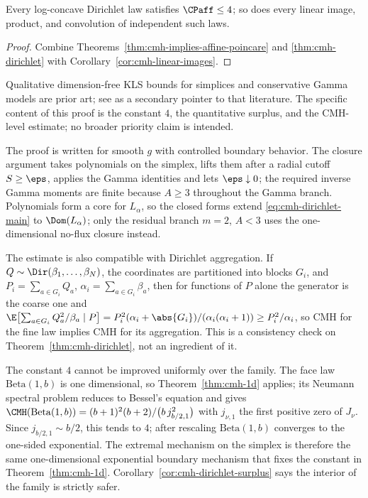 \documentclass[../../main.tex]{subfiles}
\begin{document}
\begin{corollary}
\label{cor:cmh-dirichlet-poincare}
Every log-concave Dirichlet law satisfies $\CPaff\le4$; so does every linear image, product, and
convolution of independent such laws.
\end{corollary}

\begin{proof}
Combine Theorems~\ref{thm:cmh-implies-affine-poincare} and \ref{thm:cmh-dirichlet} with
Corollary~\ref{cor:cmh-linear-images}.
\end{proof}

Qualitative dimension-free KLS bounds for simplices and conservative Gamma models are prior
art; see \cite[\S1.2]{KolesnikovMilman2016OrliczKLS} as a secondary pointer to that literature.
The specific content of this proof is the constant $4$, the quantitative surplus, and the
CMH-level estimate; no broader priority claim is intended.

\begin{remark}
\label{rem:cmh-dirichlet-closure}
The proof is written for smooth $g$ with controlled boundary behavior. The closure argument
takes polynomials on the simplex, lifts them after a radial cutoff $S\ge\eps$, applies the Gamma
identities and lets $\eps\downarrow0$; the required inverse Gamma moments are finite because
$A\ge3$ throughout the Gamma branch. Polynomials form a core for $L_\alpha$, so the closed forms
extend \eqref{eq:cmh-dirichlet-main} to $\Dom(L_\alpha)$; only the residual branch $m=2$, $A<3$
uses the one-dimensional no-flux closure instead.

The estimate is also compatible with Dirichlet aggregation. If
$Q\sim\Dir(\beta_1,\dots,\beta_N)$, the coordinates are partitioned into blocks $G_i$, and
$P_i=\sum_{a\in G_i}Q_a$, $\alpha_i=\sum_{a\in G_i}\beta_a$, then for functions of $P$ alone the
generator is the coarse one and
$\E\bigl[\sum_{a\in G_i}Q_a^2/\beta_a\mid P\bigr]
 =P_i^2(\alpha_i+\abs{G_i})/(\alpha_i(\alpha_i+1))\ge P_i^2/\alpha_i$,
so CMH for the fine law implies CMH for its aggregation. This is a consistency check on
Theorem~\ref{thm:cmh-dirichlet}, not an ingredient of it.
\end{remark}

\begin{remark}
\label{rem:cmh-dirichlet-sharp}
The constant $4$ cannot be improved uniformly over the family. The face law
$\mathrm{Beta}(1,b)$ is one dimensional, so Theorem~\ref{thm:cmh-1d} applies; its Neumann
spectral problem reduces to Bessel's equation and gives
$\CMH(\mathrm{Beta}(1,b))=(b+1)^2(b+2)/\bigl(b\,j_{b/2,1}^2\bigr)$ with $j_{\nu,1}$ the first
positive zero of $J_\nu$. Since $j_{b/2,1}\sim b/2$, this tends to $4$; after rescaling
$\mathrm{Beta}(1,b)$ converges to the one-sided exponential. The extremal mechanism on the
simplex is therefore the same one-dimensional exponential boundary mechanism that fixes the
constant in Theorem~\ref{thm:cmh-1d}. Corollary~\ref{cor:cmh-dirichlet-surplus} says the
interior of the family is strictly safer.
\end{remark}
\end{document}
